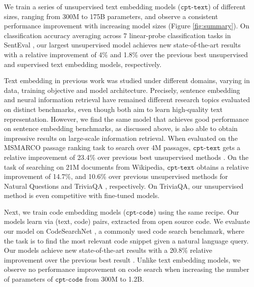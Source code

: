 \documentclass[nohyperref]{article}
\begin{document}
We train a series of unsupervised text embedding models ($\texttt{cpt-text}$) of different sizes, ranging from 300M to 175B parameters, and observe a consistent performance improvement with increasing model sizes (Figure \ref{fig:summary}). On classification accuracy averaging across 7 linear-probe classification tasks in SentEval \cite{senteval}, our largest unsupervised model achieves new state-of-the-art results with a relative improvement of 4\% and 1.8\% over the previous best unsupervised \cite{declutr} and supervised \cite{simcse} text embedding models, respectively.

Text embedding in previous work was studied under different domains, varying in data, training objective and model architecture. Precisely, sentence embedding \cite{sbert,simcse,declutr} and neural information retrieval \cite{ORQA, REALM, dpr, e2e, contreiver} have remained different research topics evaluated on distinct benchmarks, even though both aim to learn high-quality text representation.
However, we find the same model that achieves good performance on sentence embedding benchmarks, as discussed above, is also able to obtain impressive results on large-scale information retrieval. When evaluated on the MSMARCO passage ranking task \cite{msmarco} to search over 4M passages, $\texttt{cpt-text}$ gets a relative improvement of 23.4\% over previous best unsupervised methods \cite{bm25}.  On the task of searching on 21M documents from Wikipedia, $\texttt{cpt-text}$ obtains a relative improvement of 14.7\%, and 10.6\% over previous unsupervised methods \cite{contreiver} for Natural Questions \cite{nq} and TriviaQA \cite{trivia}, respectively. On TriviaQA, our unsupervised method is even competitive with fine-tuned models. 

Next, we train code embedding models ($\texttt{cpt-code}$) using the same recipe. Our models learn via (text, code) pairs, extracted from open source code. We evaluate our model on CodeSearchNet \cite{codesearchnet}, a commonly used code search benchmark, where the task is to find the most relevant code snippet given a natural language query. Our models achieve new state-of-the-art results with a 20.8\% relative improvement over the previous best result \cite{Guo}. Unlike text embedding models, we observe no performance improvement on code search when increasing the number of parameters of $\texttt{cpt-code}$ from 300M to 1.2B.
\end{document}
